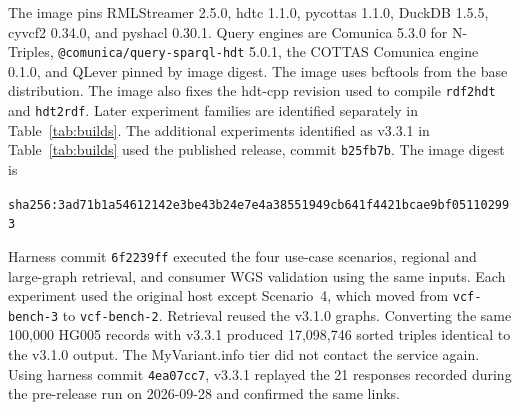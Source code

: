 \documentclass[11pt]{article}
\begin{document}
The image pins RMLStreamer 2.5.0, hdtc 1.1.0, pycottas 1.1.0, DuckDB 1.5.5, cyvcf2 0.34.0, and pyshacl 0.30.1.
Query engines are Comunica 5.3.0 for N-Triples, \nolinkurl{@comunica/query-sparql-hdt} 5.0.1, the COTTAS Comunica engine 0.1.0, and QLever pinned by image digest.
The image uses bcftools from the base distribution.
The image also fixes the hdt-cpp revision used to compile \texttt{rdf2hdt} and \texttt{hdt2rdf}.
Later experiment families are identified separately in Table~\ref{tab:builds}.
The additional experiments identified as v3.3.1 in Table~\ref{tab:builds} used the published release, commit \texttt{b25fb7b}.
The image digest is
\begin{center}\footnotesize\texttt{sha256:3ad71b1a54612142e3be43b24e7e4a38551949cb641f4421bcae9bf051102993}\end{center}
Harness commit \texttt{6f2239ff} executed the four use-case scenarios, regional and large-graph retrieval, and consumer WGS validation using the same inputs.
Each experiment used the original host except Scenario~4, which moved from \texttt{vcf-bench-3} to \texttt{vcf-bench-2}.
Retrieval reused the v3.1.0 graphs.
Converting the same 100,000 HG005 records with v3.3.1 produced 17,098,746 sorted triples identical to the v3.1.0 output.
The MyVariant.info tier did not contact the service again.
Using harness commit \texttt{4ea07cc7}, v3.3.1 replayed the 21 responses recorded during the pre-release run on 2026-09-28 and confirmed the same links.
\end{document}
